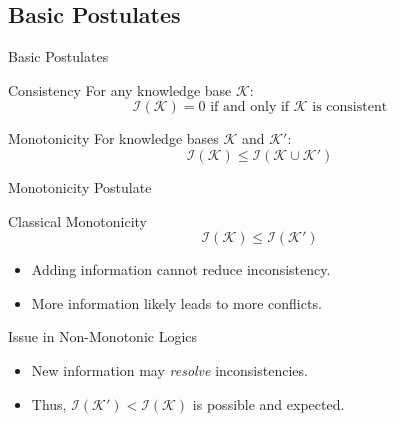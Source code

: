 \subsection{Basic Postulates}

\begin{frame}{Basic Postulates}
    \begin{block}{Consistency}
        For any knowledge base \(\mathcal{K}\):
        \[
            \mathcal{I}(\mathcal{K}) = 0 \text{ if and only if } \mathcal{K} \text{ is consistent}
        \]
    \end{block}
    \begin{alertblock}{Monotonicity}
        For knowledge bases \(\mathcal{K}\) and \(\mathcal{K}'\):
        \[
            \mathcal{I}(\mathcal{K}) \leq \mathcal{I}(\mathcal{K} \cup \mathcal{K}')
        \]
    \end{alertblock}
\end{frame}

\begin{frame}{Monotonicity Postulate}
    \begin{block}{Classical Monotonicity}
        \[
            \mathcal{I}(\mathcal{K}) \leq \mathcal{I}(\mathcal{K}')
        \]
        \begin{itemize}
            \item Adding information cannot reduce inconsistency.
            \item More information likely leads to more conflicts.
        \end{itemize}
    \end{block}
    \begin{alertblock}{Issue in Non-Monotonic Logics}
        \begin{itemize}
            \item New information may \emph{resolve} inconsistencies.
            \item Thus, \(\mathcal{I}(\mathcal{K}') < \mathcal{I}(\mathcal{K})\) is possible and expected.
        \end{itemize}
    \end{alertblock}
\end{frame}

